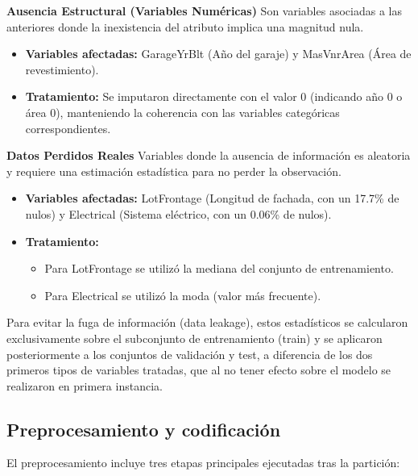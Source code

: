 \documentclass[a4paper,twocolumn]{article}
\begin{document}
	\vspace{0.2cm}

	\textbf{Ausencia Estructural (Variables Numéricas)} Son variables asociadas a las anteriores donde la inexistencia del atributo implica una magnitud nula.
	\begin{itemize}
		\item \textbf{Variables afectadas:} GarageYrBlt (Año del garaje) y MasVnrArea (Área de revestimiento).
		\item \textbf{Tratamiento:} Se imputaron directamente con el valor 0 (indicando año 0 o área 0), manteniendo la coherencia con las variables categóricas correspondientes.
	\end{itemize}

	\vspace{0.2cm}

	\textbf{Datos Perdidos Reales} Variables donde la ausencia de información es aleatoria y requiere una estimación estadística para no perder la observación.
	\begin{itemize}
		\item \textbf{Variables afectadas:} LotFrontage (Longitud de fachada, con un 17.7\% de nulos) y Electrical (Sistema eléctrico, con un 0.06\% de nulos).
		\item \textbf{Tratamiento:}
		\begin{itemize}
			\item Para LotFrontage se utilizó la mediana del conjunto de entrenamiento.
			\item Para Electrical se utilizó la moda (valor más frecuente).
		\end{itemize}
	\end{itemize}

	Para evitar la fuga de información (data leakage), estos estadísticos se calcularon exclusivamente sobre el subconjunto
	de entrenamiento (train) y se aplicaron posteriormente a los conjuntos de validación y test, a diferencia de los dos primeros
	tipos de variables tratadas, que al no tener efecto sobre el modelo se realizaron en primera instancia.

	\subsection{Preprocesamiento y codificación}

	El preprocesamiento incluye tres etapas principales ejecutadas tras la partición:

	\vspace{0.2cm}
\end{document}
